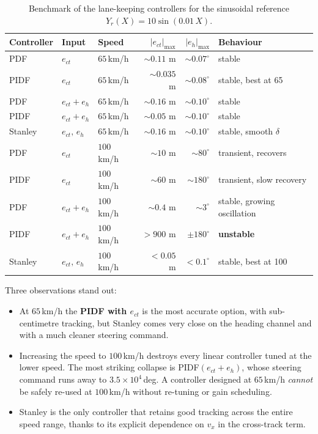 \begin{table}[H]
    \centering
    \footnotesize
    \begin{tabular}{lllrrl}
        \toprule
        \textbf{Controller} & \textbf{Input} & \textbf{Speed} &
        \textbf{$|e_{ct}|_\text{max}$} & \textbf{$|e_h|_\text{max}$} &
        \textbf{Behaviour} \\
        \midrule
        PDF     & $e_{ct}$        & $65$\,km/h  & $\sim 0.11$ m   & $\sim 0.07^\circ$  & stable \\
        PIDF    & $e_{ct}$        & $65$\,km/h  & $\sim 0.035$ m  & $\sim 0.08^\circ$  & stable, best at 65 \\
        PDF     & $e_{ct}+e_h$    & $65$\,km/h  & $\sim 0.16$ m   & $\sim 0.10^\circ$  & stable \\
        PIDF    & $e_{ct}+e_h$    & $65$\,km/h  & $\sim 0.05$ m   & $\sim 0.10^\circ$  & stable \\
        Stanley & $e_{ct},\,e_h$  & $65$\,km/h  & $\sim 0.16$ m   & $\sim 0.10^\circ$  & stable, smooth $\delta$ \\
        \midrule
        PDF     & $e_{ct}$        & $100$\,km/h & $\sim 10$ m     & $\sim 80^\circ$    & transient, recovers \\
        PIDF    & $e_{ct}$        & $100$\,km/h & $\sim 60$ m     & $\sim 180^\circ$   & transient, slow recovery \\
        PDF     & $e_{ct}+e_h$    & $100$\,km/h & $\sim 0.4$ m    & $\sim 3^\circ$     & stable, growing oscillation \\
        PIDF    & $e_{ct}+e_h$    & $100$\,km/h & $> 900$ m       & $\pm 180^\circ$    & \textbf{unstable} \\
        Stanley & $e_{ct},\,e_h$  & $100$\,km/h & $< 0.05$ m      & $< 0.1^\circ$      & stable, best at 100 \\
        \bottomrule
    \end{tabular}
    \caption{Benchmark of the lane-keeping controllers for the
    sinusoidal reference $Y_r(X)=10\sin(0.01\,X)$.}
    \label{tab:bench}
\end{table}

Three observations stand out:
\begin{itemize}
    \item At $65$\,km/h the \textbf{PIDF with $e_{ct}$} is the most
          accurate option, with sub-centimetre tracking, but Stanley
          comes very close on the heading channel and with a much
          cleaner steering command.
    \item Increasing the speed to $100$\,km/h destroys every linear
          controller tuned at the lower speed. The most striking
          collapse is PIDF$(e_{ct}+e_h)$, whose steering command runs
          away to $3.5\!\times\!10^4$\,deg. A controller designed at
          $65$\,km/h \emph{cannot} be safely re-used at $100$\,km/h
          without re-tuning or gain scheduling.
    \item Stanley is the only controller that retains good tracking
          across the entire speed range, thanks to its explicit
          dependence on $v_x$ in the cross-track term.
\end{itemize}

